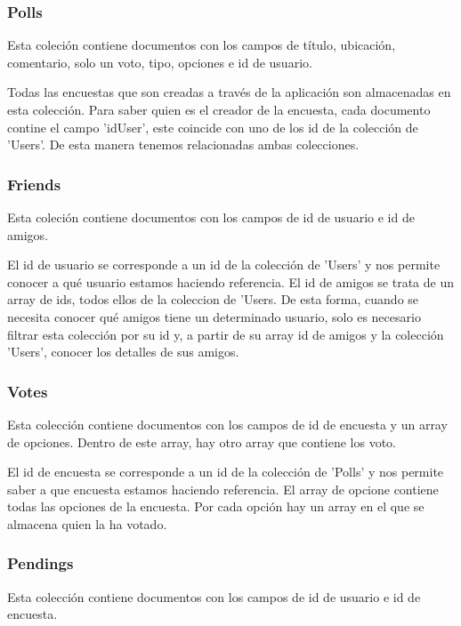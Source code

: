 \documentclass[a4paper, 12pt]{book}
\begin{document}
\subsubsection{Polls} 
\label{sec:c_polls}
Esta coleci\'on contiene documentos con los campos de t\'itulo, ubicaci\'on, comentario, solo un voto, tipo, opciones e id de usuario.

Todas las encuestas que son creadas a trav\'es de la aplicaci\'on son almacenadas en esta colecci\'on. Para saber quien es el creador de la encuesta, cada documento contine el campo 'idUser', este coincide con uno de los id de la colecci\'on de 'Users'. De esta manera tenemos relacionadas ambas colecciones.

\subsubsection{Friends} 
\label{sec:c_friends}
Esta coleci\'on contiene documentos con los campos de id de usuario e id de amigos.

El id de usuario se corresponde a un id de la colecci\'on de 'Users' y nos permite conocer a qu\'e usuario estamos haciendo referencia. El id de amigos se trata de un array de ids, todos ellos de la coleccion de 'Users. De esta forma, cuando se necesita conocer qu\'e amigos tiene un determinado usuario, solo es necesario filtrar esta colecci\'on por su id y, a partir de su array id de amigos y la colecci\'on 'Users', conocer los detalles de sus amigos. 

\subsubsection{Votes} 
\label{sec:c_votes}

Esta colecci\'on contiene documentos con los campos de id de encuesta y un array de opciones. Dentro de este array, hay otro array que contiene los voto.

El id de encuesta se corresponde a un id de la colecci\'on de 'Polls' y nos permite saber a que encuesta estamos haciendo referencia. El array de opcione contiene todas las opciones de la encuesta. Por cada opci\'on hay un array en el que se almacena quien la ha votado. 


\subsubsection{Pendings} 
\label{sec:c_pending}

Esta colecci\'on contiene documentos con los campos de id de usuario e id de encuesta.
\end{document}

